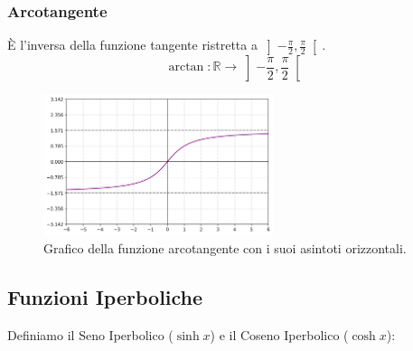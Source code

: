 \documentclass[oneside,10pt]{book} %
\begin{document}
\subsubsection{Arcotangente}
È l'inversa della funzione tangente ristretta a \(\left]-\frac{\pi}{2}, \frac{\pi}{2}\right[\).
\[ \arctan: \mathbb{R} \rightarrow \left]-\frac{\pi}{2}, \frac{\pi}{2}\right[ \]

\begin{figure}[H]
    \centering
    \includegraphics[width=0.6\textwidth]{./img/arcotangente.png}
    \caption{Grafico della funzione arcotangente con i suoi asintoti orizzontali.}
    \label{fig:arcotangente}
\end{figure}
\FloatBarrier

\subsection{Funzioni Iperboliche}
Definiamo il Seno Iperbolico ($\sinh x$) e il Coseno Iperbolico ($\cosh x$):
\end{document}
